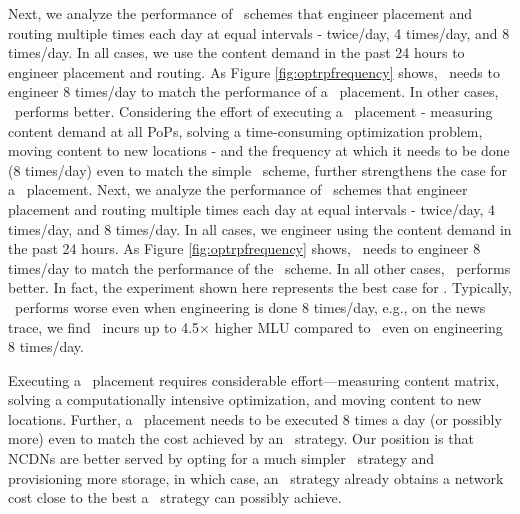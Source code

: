\eat
{
Next, we analyze the performance of \planned\ schemes that engineer placement and routing multiple times each day at equal intervals - twice/day, 4 times/day, and 8 times/day. In all cases, we use the content demand in the past 24 hours to engineer placement and routing. As Figure \ref{fig:optrpfrequency} shows, \optrp\ needs to engineer 8 times/day to match the performance of a \unplanned\ placement. 
In other cases, \invlru\ performs better. Considering the effort of executing a \planned\ placement - measuring content demand at all PoPs, solving a time-consuming optimization problem, moving content to new locations - and the frequency at which it needs to be done (8 times/day)  even to match the simple \invlru\ scheme, further strengthens the case for a \unplanned\ placement. 
}
Next, we analyze the performance of \planned\ schemes that engineer placement and routing multiple times each day at equal intervals - twice/day, 4 times/day, and 8 times/day. In all cases, we engineer using the content demand in the past 24 hours. As Figure \ref{fig:optrpfrequency} shows, \optrp\ needs to engineer 8 times/day to match the performance of the \invlru\ scheme. In all other cases, \invlru\ performs better.  In fact, the experiment shown here represents the best case for \optrp. Typically, \optrp\ performs worse even when engineering is done 8 times/day, e.g., on the news trace, we find \optrp\ incurs up to 4.5$\times$ higher MLU compared to \invlru\ even on engineering 8 times/day.


Executing a \planned\ placement requires considerable effort---measuring content matrix, solving a computationally intensive optimization, and moving content to new locations. Further, a \planned\ placement needs to be executed  8 times a day (or possibly more) even to match the cost achieved by an \unplanned\ strategy. Our position is that NCDNs are better served by opting for a much simpler \unplanned\ strategy and provisioning more storage, in which case, an \unplanned\ strategy  already obtains  a network cost close to the best a \planned\ strategy can possibly achieve.



